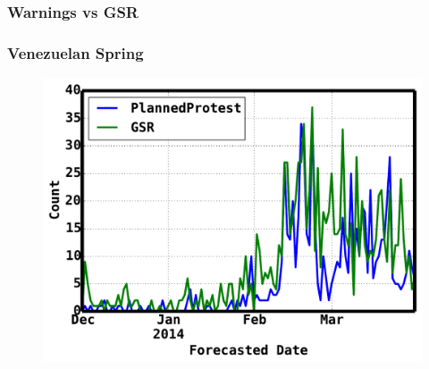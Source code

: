 \documentclass{beamer}
\begin{document}
\begin{frame}
    \frametitle{Warnings vs GSR}
    \begin{figure}%
    \centering
    \qquad
    \end{figure}
\end{frame}

\begin{frame}
     \frametitle{Venezuelan Spring}
     \begin{figure}
        \centering
        \includegraphics[scale=0.4]{venezuela}
     \end{figure}
\end{frame}
\end{document}
